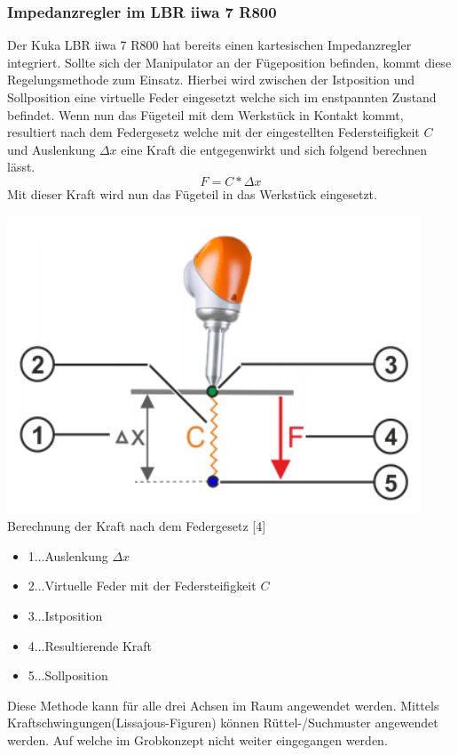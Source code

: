 \documentclass[12pt]{article}
\begin{document}
\subsubsection{Impedanzregler im LBR iiwa 7 R800}
Der Kuka LBR iiwa 7 R800 hat bereits einen kartesischen Impedanzregler integriert. Sollte sich der Manipulator an der Fügeposition befinden, kommt diese Regelungsmethode zum Einsatz. Hierbei wird zwischen der Istposition und Sollposition eine virtuelle Feder eingesetzt welche sich im enstpannten Zustand befindet. Wenn nun das Fügeteil mit dem Werkstück in Kontakt kommt, resultiert nach dem Federgesetz welche mit der eingestellten Federsteifigkeit $ C $ und Auslenkung $ \Delta x $ eine Kraft die entgegenwirkt und sich folgend berechnen lässt. \[F = C * \Delta x\] Mit dieser Kraft wird nun das Fügeteil in das Werkstück eingesetzt.\\
\begin{center}
\includegraphics[scale=0.5]{img/Impedanzregler_Kuka}
\\Berechnung der Kraft nach dem Federgesetz [4]
\begin{itemize}
\item 1...Auslenkung $\Delta x$
\item 2...Virtuelle Feder mit der Federsteifigkeit $C$
\item 3...Istposition
\item 4...Resultierende Kraft
\item 5...Sollposition
\end{itemize} 
\end{center}
Diese Methode kann für alle drei Achsen im Raum angewendet werden.
Mittels Kraftschwingungen(Lissajous-Figuren) können Rüttel-/Suchmuster angewendet werden. Auf welche im Grobkonzept nicht weiter eingegangen werden.
\end{document}
